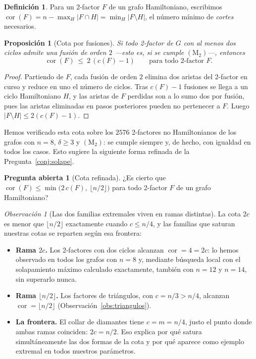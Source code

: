 \documentclass[11pt,a4paper]{article}
\newtheorem{proposicion}[teorema]{Proposición}
\theoremstyle{definition}
\newtheorem{definicion}[teorema]{Definición}
\newtheorem{pregunta}[teorema]{Pregunta abierta}
\theoremstyle{remark}
\newtheorem{observacion}[teorema]{Observación}
\begin{document}
\begin{definicion}
Para un 2-factor $F$ de un grafo Hamiltoniano, escribimos $\operatorname{cor}(F)=n-\max_H|F\cap H|=\min_H|F\setminus H|$, el número mínimo de \emph{cortes} necesarios.
\end{definicion}

\begin{proposicion}[Cota por fusiones]\label{prop:cortes2c}
Si todo 2-factor de $G$ con al menos dos ciclos admite una fusión de orden $2$ —esto es, si se cumple $(\mathrm{M}_2)$—, entonces
\[
\operatorname{cor}(F)\ \le\ 2\,(c(F)-1)\qquad\text{para todo 2-factor }F .
\]
\end{proposicion}

\begin{proof}
Partiendo de $F$, cada fusión de orden $2$ elimina dos aristas del 2-factor en curso y reduce en uno el número de ciclos. Tras $c(F)-1$ fusiones se llega a un ciclo Hamiltoniano $H$, y las aristas de $F$ perdidas son a lo sumo dos por fusión, pues las aristas eliminadas en pasos posteriores pueden no pertenecer a $F$. Luego $|F\setminus H|\le2(c(F)-1)$.
\end{proof}

Hemos verificado esta cota sobre los $2576$ 2-factores no Hamiltonianos de los grafos con $n=8$, $\delta\ge3$ y $(\mathrm{M}_2)$: se cumple siempre y, de hecho, con igualdad en todos los casos. Esto sugiere la siguiente forma refinada de la Pregunta~\ref{conj:solape}.

\begin{pregunta}[Cota refinada]\label{conj:refinada}
¿Es cierto que $\operatorname{cor}(F)\le\min\big(2\,c(F),\ \lfloor n/2\rfloor\big)$ para todo 2-factor $F$ de un grafo Hamiltoniano?
\end{pregunta}

\begin{observacion}[Las dos familias extremales viven en ramas distintas]\label{obs:ramas}
La cota $2c$ es menor que $\lfloor n/2\rfloor$ exactamente cuando $c\le n/4$, y las familias que saturan nuestras cotas se reparten según esa frontera:
\begin{itemize}
\item \textbf{Rama $2c$.} Los 2-factores con dos ciclos alcanzan $\operatorname{cor}=4=2c$: lo hemos observado en todos los grafos con $n=8$ y, mediante búsqueda local con el solapamiento máximo calculado exactamente, también con $n=12$ y $n=14$, sin superarlo nunca.
\item \textbf{Rama $\lfloor n/2\rfloor$.} Los factores de triángulos, con $c=n/3>n/4$, alcanzan $\operatorname{cor}=\lfloor n/2\rfloor$ (Observación~\ref{obs:triangulos}).
\item \textbf{La frontera.} El collar de diamantes tiene $c=m=n/4$, justo el punto donde ambas ramas coinciden: $2c=n/2$. Eso explica por qué satura simultáneamente las dos formas de la cota y por qué aparece como ejemplo extremal en todos nuestros parámetros.
\end{itemize}
\end{observacion}
\end{document}
